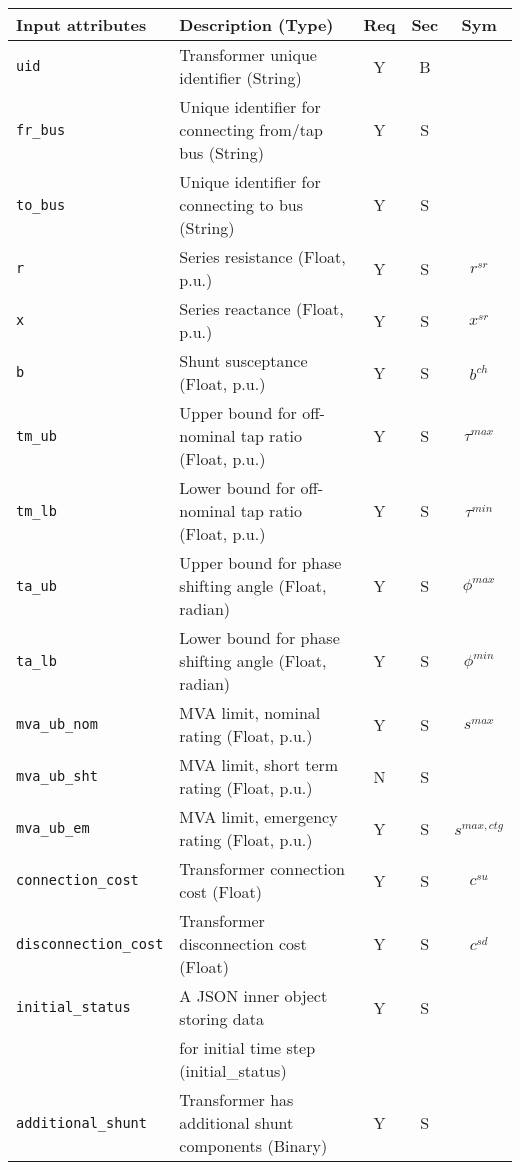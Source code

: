 \documentclass{article}
\begin{document}
\begin{center}
\small
\begin{tabular}{ l | l | c | c | c |}
Input attributes & Description (Type) & Req & Sec & Sym\\
\hline
  {\tt uid} & Transformer unique identifier (String)& Y & B & \\
  {\tt fr\_bus} & Unique identifier for connecting from/tap bus (String)& Y & S & \\
  {\tt to\_bus} & Unique identifier for connecting to bus (String)& Y & S & \\
  {\tt r} & Series resistance (Float, p.u.)& Y & S & $r^{sr}$\\
  {\tt x} & Series reactance  (Float, p.u.)& Y & S & $x^{sr}$\\
  {\tt b} & Shunt susceptance (Float, p.u.)& Y & S & $b^{ch}$ \\
  {\tt tm\_ub} & Upper bound for off-nominal tap ratio (Float, p.u.)& Y & S & $\tau^{max}$\\
  {\tt tm\_lb} & Lower bound for off-nominal tap ratio (Float, p.u.)& Y & S & $\tau^{min}$\\
  {\tt ta\_ub} & Upper bound for phase shifting angle (Float, radian)& Y & S & $\phi^{max}$\\
  {\tt ta\_lb} & Lower bound for phase shifting angle (Float, radian)& Y & S & $\phi^{min}$\\
  {\tt mva\_ub\_nom} & MVA limit, nominal rating (Float, p.u.) & Y & S & $s^{max}$ \\
  {\tt mva\_ub\_sht} & MVA limit, short term rating (Float, p.u.) & N & S &  \\
  {\tt mva\_ub\_em} & MVA limit, emergency rating (Float, p.u.) & Y & S & $s^{max,ctg}$ \\
  {\tt connection\_cost} &  Transformer connection cost (Float) & Y & S & $c^{su}$\\
  {\tt disconnection\_cost} & Transformer disconnection cost (Float) & Y & S & $c^{sd}$\\
  {\tt initial\_status} & A JSON inner object storing data  & Y & S &  \\
       & for initial time step (initial\_status) &  &  &  \\
  {\tt additional\_shunt} & Transformer has additional shunt components (Binary)& Y & S & \\
  \hline
\end{tabular}
\end{center}
  
  
  
\end{document}
